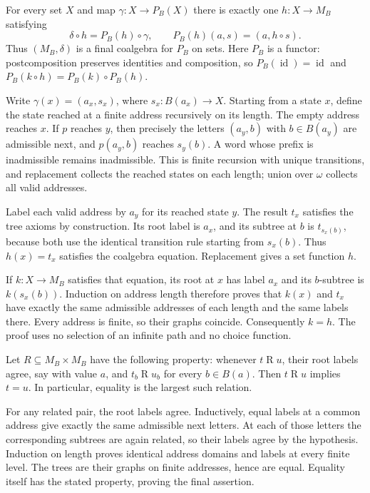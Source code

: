 \begin{theorem}
\label{thm:M_final_coalgebra}
For every set $X$ and map $\gamma:X\to P_B(X)$ there is exactly one
$h:X\to M_B$ satisfying
\[
\delta\circ h=P_B(h)\circ\gamma,
\qquad P_B(h)(a,s)=(a,h\circ s).
\]
Thus $(M_B,\delta)$ is a final coalgebra for $P_B$ on sets.
Here $P_B$ is a functor: postcomposition preserves identities and
composition, so $P_B(\operatorname{id})=\operatorname{id}$ and
$P_B(k\circ h)=P_B(k)\circ P_B(h)$.
\end{theorem}
\Proof
Write $\gamma(x)=(a_x,s_x)$, where $s_x:B(a_x)\to X$.
Starting from a state $x$, define the state reached at a finite address
recursively on its length. The empty address reaches $x$. If $p$ reaches
$y$, then precisely the letters $(a_y,b)$ with $b\in B(a_y)$ are
admissible next, and $p(a_y,b)$ reaches $s_y(b)$. A word whose prefix
is inadmissible remains inadmissible. This is finite recursion with
unique transitions, and replacement collects the reached states on
each length; union over $\omega$ collects all valid addresses.

Label each valid address by $a_y$ for its reached state $y$. The result
$t_x$ satisfies the tree axioms by construction. Its root label is $a_x$,
and its subtree at $b$ is $t_{s_x(b)}$, because both use the identical
transition rule starting from $s_x(b)$. Thus $h(x)=t_x$ satisfies the
coalgebra equation. Replacement gives a set function $h$.

If $k:X\to M_B$ satisfies that equation, its root at $x$ has label
$a_x$ and its $b$-subtree is $k(s_x(b))$. Induction on address length
therefore proves that $k(x)$ and $t_x$ have exactly the same admissible
addresses of each length and the same labels there. Every address is
finite, so their graphs coincide. Consequently $k=h$.
The proof uses no selection of an infinite path and no choice function.
\Done

\begin{theorem}
Let $R\subseteq M_B\times M_B$ have the following property: whenever
$t\mathrel R u$, their root labels agree, say with value $a$, and
$t_b\mathrel R u_b$ for every $b\in B(a)$. Then $t\mathrel R u$
implies $t=u$. In particular, equality is the largest such relation.
\end{theorem}
\Proof
For any related pair, the root labels agree. Inductively, equal labels
at a common address give exactly the same admissible next letters.
At each of those letters the corresponding subtrees are again related,
so their labels agree by the hypothesis. Induction on length proves
identical address domains and labels at every finite level. The trees
are their graphs on finite addresses, hence are equal. Equality itself
has the stated property, proving the final assertion.
\Done

